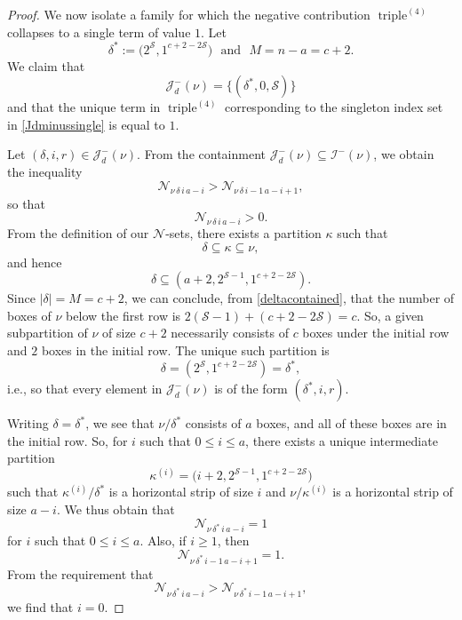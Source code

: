 \documentclass[10pt,a4paper]{amsart}
\begin{document}
\begin{proof}
 We now isolate a family for which the negative contribution 
\(\operatorname{triple}^{(4)}\) collapses to a single term of value \(1\). Let 
 $$ \delta^{\ast} := \big( 2^{\mathcal{S}}, 1^{c+2-2\mathcal{S}} \big) \ \ \ \text{and} 
 \ \ \ M = n - a = c + 2. $$
 We claim that 
\begin{equation}\label{Jdminussingle}
 \mathcal{J}_{d}^{-}(\nu) = \big\{ (\delta^{\ast}, 0, \mathcal{S} ) \big\} 
\end{equation}
 and that the unique term in $\operatorname{triple}^{(4)}$ corresponding to the singleton index set in \eqref{Jdminussingle} is 
 equal to $1$. 

 Let $(\delta, i, r) \in \mathcal{J}_{d}^{-}(\nu)$. From the containment $\mathcal{J}_{d}^{-}(\nu) \subseteq \mathcal{I}^{-}(\nu)$, we obtain 
 the inequality $$ \mathcal{N}_{\nu \, \delta \, i \, a - i} > \mathcal{N}_{\nu \, \delta \, i - 1 \, a - i + 1}, $$ so that $$ \mathcal{N}_{\nu 
 \, \delta \, i \, a - i} > 0. $$ From the definition of our $\mathcal{N}$-sets, there exists a partition $\kappa$ such that $$ \delta \subseteq 
 \kappa \subseteq \nu, $$ and hence 
\begin{equation}\label{deltacontained}
 \delta \subseteq (a+2, 2^{\mathcal{S}-1}, 1^{c+2-2\mathcal{S}}).
\end{equation}
 Since $|\delta| = M = c + 2$, we can conclude, from \eqref{deltacontained}, that the number of boxes of $\nu$ below the first row is
 $2 (\mathcal{S}-1) + (c + 2 - 2 \mathcal{S}) =c$. So, a given subpartition of $\nu$ of size $c+2$ necessarily consists of $c$ boxes
 under the initial row and $2$ boxes in the initial row. The unique such partition is $$ \delta = (2^\mathcal{S}, 1^{c + 2 - 
 2\mathcal{S}}) = \delta^{\ast}, $$ i.e., so that every element in $\mathcal{J}_{d}^{-}(\nu)$ is of the form $(\delta^{\ast}, i, r)$.
 
 Writing $\delta = \delta^{\ast}$, we see that $ \nu / \delta^{\ast} $ consists of $a$ boxes, and all of these boxes are in the initial row. 
 So, for $i$ such that $0 \leq i \leq a$, there exists a unique intermediate partition $$ \kappa^{(i)} = \big( i + 2, 2^{\mathcal{S}-1}, 
 1^{c + 2 - 2 \mathcal{S}} \big) $$ such that $\kappa^{(i)} / \delta^{\ast}$ is a horizontal strip of size $i$ and $\nu / \kappa^{(i)}$ is a 
 horizontal strip of size $a - i$. We thus obtain that $$ \mathcal{N}_{\nu \, \delta^{\ast} \, i \, a - i} = 1 $$ for $i$ such that $0 \leq i \leq 
 a$. Also, if $i \geq 1$, then $$ \mathcal{N}_{\nu \, \delta^{\ast} \, i - 1 \, a - i + 1 } = 1.$$ From the requirement that $$ \mathcal{N}_{\nu 
 \, \delta^{\ast} \, i \, a - i } > \mathcal{N}_{\nu \, \delta^{\ast} \, i - 1 \, a - i +1}, $$ we find that $ i = 0$. 


\end{proof}
\end{document}
